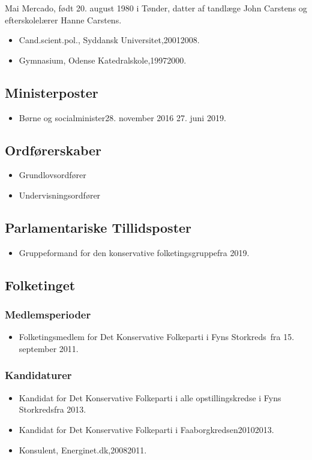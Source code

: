 \documentclass[11pt, a4paper]{awesome-cv}
\begin{document}
\makecvheader[R]
\makelettertitle
\begin{cvletter}
Mai Mercado, født 20. august 1980 i Tønder, datter af tandlæge John Carstens og efterskolelærer Hanne Carstens.

\begin{itemize}
\item Cand.scient.pol., Syddansk Universitet,20012008.
\item Gymnasium, Odense Katedralskole,19972000.
\end{itemize}
\subsection*{Ministerposter}
\begin{itemize}
\item Børne og socialminister28. november 2016  27. juni 2019.
\end{itemize}
\subsection*{Ordførerskaber}
\begin{itemize}
\item Grundlovsordfører
\item Undervisningsordfører
\end{itemize}
\subsection*{Parlamentariske Tillidsposter}
\begin{itemize}
\item Gruppeformand for den konservative folketingsgruppefra 2019.
\end{itemize}
\subsection*{Folketinget}
\subsubsection*{Medlemsperioder}
\begin{itemize}
\item Folketingsmedlem for Det Konservative Folkeparti i Fyns Storkreds fra 15. september 2011.
\end{itemize}
\subsubsection*{Kandidaturer}
\begin{itemize}
\item Kandidat for Det Konservative Folkeparti i alle opstillingskredse i Fyns Storkredsfra 2013.
\item Kandidat for Det Konservative Folkeparti i Faaborgkredsen20102013.
\end{itemize}
\begin{itemize}
\item Konsulent, Energinet.dk,20082011.
\end{itemize}
\end{cvletter}
\end{document}
